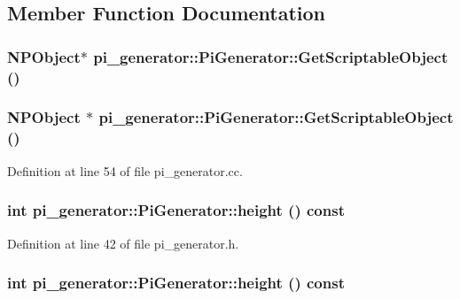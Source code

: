 \subsection{Member Function Documentation}
\hypertarget{classpi__generator_1_1_pi_generator_aeb7cbec490908be34f2b269bd23fdd55}{
\subsubsection[{GetScriptableObject}]{\setlength{\rightskip}{0pt plus 5cm}NPObject$\ast$ pi\_\-generator::PiGenerator::GetScriptableObject ()}}
\label{classpi__generator_1_1_pi_generator_aeb7cbec490908be34f2b269bd23fdd55}
\hypertarget{classpi__generator_1_1_pi_generator_ac65f31616ae3d223bdc01b91aea91762}{
\subsubsection[{GetScriptableObject}]{\setlength{\rightskip}{0pt plus 5cm}NPObject $\ast$ pi\_\-generator::PiGenerator::GetScriptableObject ()}}
\label{classpi__generator_1_1_pi_generator_ac65f31616ae3d223bdc01b91aea91762}


Definition at line 54 of file pi\_\-generator.cc.

\hypertarget{classpi__generator_1_1_pi_generator_a7cdc6f6c02a01a63e813c8357e901fb9}{
\subsubsection[{height}]{\setlength{\rightskip}{0pt plus 5cm}int pi\_\-generator::PiGenerator::height () const}}
\label{classpi__generator_1_1_pi_generator_a7cdc6f6c02a01a63e813c8357e901fb9}


Definition at line 42 of file pi\_\-generator.h.

\hypertarget{classpi__generator_1_1_pi_generator_a7cdc6f6c02a01a63e813c8357e901fb9}{
\subsubsection[{height}]{\setlength{\rightskip}{0pt plus 5cm}int pi\_\-generator::PiGenerator::height () const}}
\label{classpi__generator_1_1_pi_generator_a7cdc6f6c02a01a63e813c8357e901fb9}


